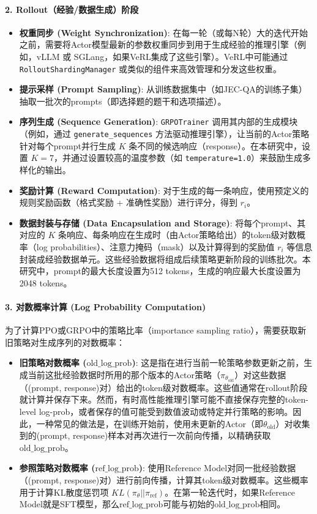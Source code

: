 \documentclass{article}
\begin{document}
\paragraph{2. Rollout（经验/数据生成）阶段}
\begin{itemize}
    \item \textbf{权重同步 (Weight Synchronization)}: 在每一轮（或每N轮）大的迭代开始之前，需要将Actor模型最新的参数权重同步到用于生成经验的推理引擎（例如，vLLM 或 SGLang，如果VeRL集成了这些引擎）。VeRL中可能通过 \texttt{RolloutShardingManager} 或类似的组件来高效管理和分发这些权重。
    \item \textbf{提示采样 (Prompt Sampling)}: 从训练数据集中（如JEC-QA的训练子集）抽取一批次的prompts（即选择题的题干和选项描述）。
    \item \textbf{序列生成 (Sequence Generation)}: \texttt{GRPOTrainer} 调用其内部的生成模块（例如，通过 \texttt{generate\_sequences} 方法驱动推理引擎），让当前的Actor策略针对每个prompt并行生成 $K$ 条不同的候选响应（response）。在本研究中，设置 $K=7$，并通过设置较高的温度参数（如 \texttt{temperature=1.0}）来鼓励生成多样化的输出。
    \item \textbf{奖励计算 (Reward Computation)}: 对于生成的每一条响应，使用预定义的规则奖励函数（格式奖励 + 准确性奖励）进行评分，得到 $r_i$。
    \item \textbf{数据封装与存储 (Data Encapsulation and Storage)}: 将每个prompt、其对应的 $K$ 条响应、每条响应在生成时（由Actor策略给出）的token级对数概率（log probabilities）、注意力掩码（mask）以及计算得到的奖励值 $r_i$ 等信息封装成经验数据单元。这些经验数据将组成后续策略更新阶段的训练批次。本研究中，prompt的最大长度设置为512 tokens，生成的响应最大长度设置为2048 tokens。
\end{itemize}

\paragraph{3. 对数概率计算 (Log Probability Computation)}
为了计算PPO或GRPO中的策略比率（importance sampling ratio），需要获取新旧策略对生成序列的对数概率：
\begin{itemize}
    \item \textbf{旧策略对数概率 ($\text{old\_log\_prob}$)}: 这是指在进行当前一轮策略参数更新之前，生成当前这批经验数据时所用的那个版本的Actor策略（$\pi_{\theta_{\text{old}}}$）对这些数据（(prompt, response)对）给出的token级对数概率。这些值通常在rollout阶段就计算并保存下来。然而，有时高性能推理引擎可能不直接保存完整的token-level log-prob，或者保存的值可能受到数值波动或特定并行策略的影响。因此，一种常见的做法是，在训练开始前，使用未更新的Actor（即$\theta_{\text{old}}$）对收集到的(prompt, response)样本对再次进行一次前向传播，以精确获取$\text{old\_log\_prob}$。
    \item \textbf{参照策略对数概率 ($\text{ref\_log\_prob}$)}: 使用Reference Model对同一批经验数据（(prompt, response)对）进行前向传播，计算其token级对数概率。这些概率用于计算KL散度惩罚项 $KL(\pi_{\theta} || \pi_{\text{ref}})$。在第一轮迭代时，如果Reference Model就是SFT模型，那么$\text{ref\_log\_prob}$可能与初始的$\text{old\_log\_prob}$相同。
\end{itemize}
\end{document}
